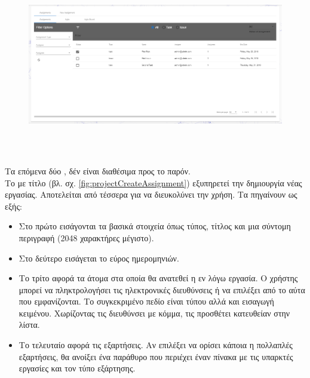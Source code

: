\begin{figure}[!htb]
\includegraphics[width=\linewidth, height=8cm]{images/projectAssignmentsAssignments.png}
\caption{}
\label{fig:projectAssignmentsAssignments}
\end{figure}

\pSpace Τα επόμενα δύο , δέν είναι διαθέσιμα προς το παρόν.\\

\pSpace Το  με τίτλο  (βλ. σχ. \ref{fig:projectCreateAssignment}) εξυπηρετεί την δημιουργία νέας εργασίας. Αποτελείται από τέσσερα  για να διευκολύνει την χρήση. Τα  πηγαίνουν ως εξής:\\

\begin{itemize}
	\item Στο πρώτο εισάγονται τα βασικά στοιχεία όπως τύπος, τίτλος και μια σύντομη περιγραφή (2048 χαρακτήρες μέγιστο).
	\item Στο δεύτερο εισάγεται το εύρος ημερομηνιών.
	\item Το τρίτο αφορά τα άτομα στα οποία θα ανατεθεί η εν λόγω εργασία. Ο χρήστης μπορεί να πληκτρολογήσει τις ηλεκτρονικές διευθύνσεις ή να επιλέξει από το αύτα που εμφανίζονται. Το συγκεκριμένο πεδίο είναι τύπου  αλλά και εισαγωγή κειμένου. Χωρίζοντας τις διευθύνσει με κόμμα, τις προσθέτει κατευθείαν στην λίστα.
	\item Το τελευταίο αφορά τις εξαρτήσεις. Αν επιλέξει να ορίσει κάποια η πολλαπλές εξαρτήσεις, θα ανοίξει ένα  παράθυρο που περιέχει έναν πίνακα με τις υπαρκτές εργασίες και τον τύπο εξάρτησης.
\end{itemize}

